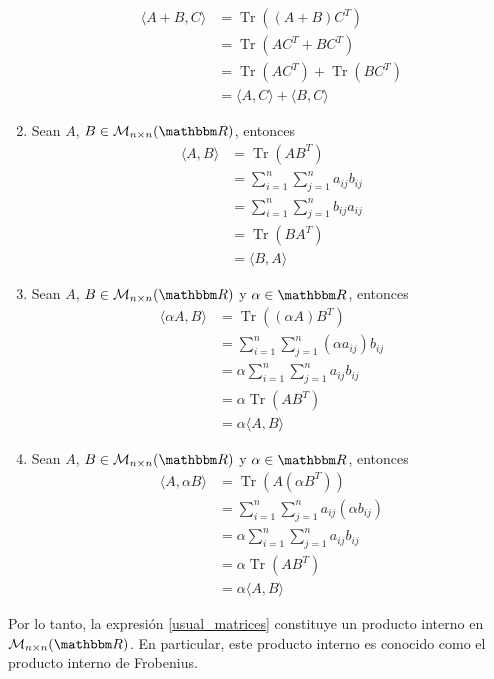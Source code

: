 \begin{example}
\begin{enumerate}[label=\roman*)]
        \begin{align*}
            \langle A + B, C \rangle & = \operatorname{Tr} \left( (A + B)C^T \right) \\
            & = \operatorname{Tr} \left( AC^T + BC^T \right) \\
            & = \operatorname{Tr} \left( AC^T \right) + \operatorname{Tr} \left( BC^T \right) \\
            & = \langle A, C \rangle + \langle B, C \rangle
        \end{align*}
        \item Sean $A$, $B \in \mathcal{M}_{n \times n}(\RR)$, entonces
        \begin{align*}
            \langle A, B \rangle & = \operatorname{Tr}\left(AB^T\right) \\
            & = \sum_{i=1}^n \sum_{j=1}^n a_{ij} b_{ij} \\
            & = \sum_{i=1}^n \sum_{j=1}^n b_{ij} a_{ij} \\
            & = \operatorname{Tr}\left(BA^T\right) \\
            & = \langle B, A \rangle
        \end{align*}
        \item Sean $A$, $B \in \mathcal{M}_{n \times n}(\RR)$ y $\alpha \in \RR$, entonces
        \begin{align*}
            \langle \alpha A, B \rangle & = \operatorname{Tr}\left((\alpha A)B^T\right) \\
            & = \sum_{i=1}^n \sum_{j=1}^n (\alpha a_{ij}) b_{ij} \\
            & = \alpha \sum_{i=1}^n \sum_{j=1}^n a_{ij} b_{ij} \\
            & = \alpha \operatorname{Tr}\left(AB^T\right) \\
            & = \alpha \langle A, B \rangle
        \end{align*}
        \item Sean $A$, $B \in \mathcal{M}_{n \times n}(\RR)$ y $\alpha \in \RR$, entonces
        \begin{align*}
            \langle A, \alpha B \rangle & = \operatorname{Tr}\left(A \left(\alpha B^T \right)\right) \\
            & = \sum_{i=1}^n \sum_{j=1}^n a_{ij} (\alpha b_{ij}) \\
            & = \alpha \sum_{i=1}^n \sum_{j=1}^n a_{ij} b_{ij} \\
            & = \alpha \operatorname{Tr}\left(AB^T\right) \\
            & = \alpha \langle A, B \rangle
        \end{align*}
    \end{enumerate}
    Por lo tanto, la expresión \eqref{usual_matrices} constituye un producto interno en $\mathcal{M}_{n \times n}(\RR)$. En particular, este producto interno es conocido como el producto interno de Frobenius.
\end{example}

